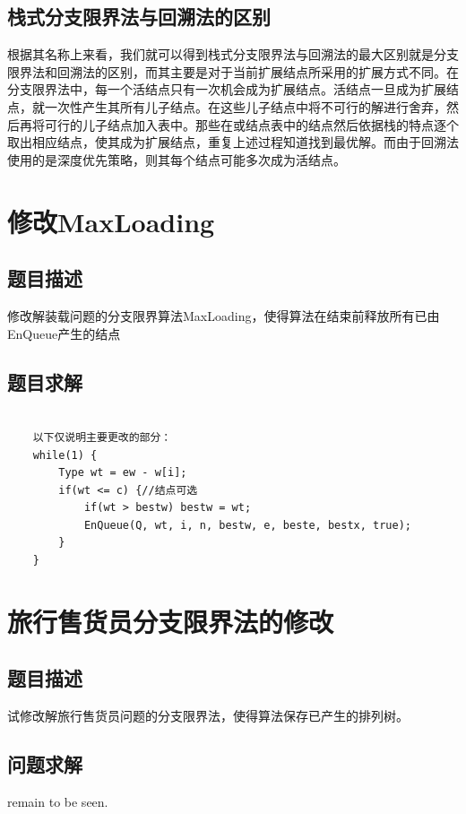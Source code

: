\documentclass[UTF8]{ctexart}
\begin{document}
    \subsection{栈式分支限界法与回溯法的区别}
    根据其名称上来看，我们就可以得到栈式分支限界法与回溯法的最大区别就是分支限界法和回溯法的区别，而其主要是对于当前扩展结点所采用的扩展方式不同。在分支限界法中，每一个活结点只有一次机会成为扩展结点。活结点一旦成为扩展结点，就一次性产生其所有儿子结点。在这些儿子结点中将不可行的解进行舍弃，然后再将可行的儿子结点加入表中。那些在或结点表中的结点然后依据栈的特点逐个取出相应结点，使其成为扩展结点，重复上述过程知道找到最优解。而由于回溯法使用的是深度优先策略，则其每个结点可能多次成为活结点。

    \section{修改MaxLoading}
    \subsection{题目描述}
    修改解装载问题的分支限界算法MaxLoading，使得算法在结束前释放所有已由EnQueue产生的结点
    \subsection{题目求解}
    \begin{small}
    \begin{lstlisting}

    以下仅说明主要更改的部分：
    while(1) {
        Type wt = ew - w[i];
        if(wt <= c) {//结点可选
            if(wt > bestw) bestw = wt;
            EnQueue(Q, wt, i, n, bestw, e, beste, bestx, true);
        }
    }
    \end{lstlisting}
    \end{small}

    \section{旅行售货员分支限界法的修改}
    \subsection{题目描述}
    试修改解旅行售货员问题的分支限界法，使得算法保存已产生的排列树。
    \subsection{问题求解}
    remain to be seen.
\end{document}
